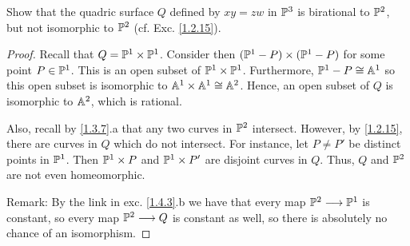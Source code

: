 \label{1.4.5}

Show that the quadric surface $Q$ defined by $xy = zw$ in $\P^3$ is birational to $\P^2$, but not isomorphic to $\P^2$ (cf. Exc. \ref{1.2.15}).

\begin{proof}
    Recall that $Q = \P^1 \times \P^1$. Consider then $(\P^1 - P) \times (\P^1 - P)$ for some point $P \in \P^1$. This is an open subset of $\P^1 \times \P^1$. Furthermore, $\P^1 - P \cong \A^1$ so this open subset is isomorphic to $\A^1 \times \A^1 \cong \A^2$. Hence, an open subset of $Q$ is isomorphic to $\A^2$, which is rational.

    Also, recall by \ref{1.3.7}.a that any two curves in $\P^2$ intersect. However, by \ref{1.2.15}, there are curves in $Q$ which do not intersect. For instance, let $P \neq P'$ be distinct points in $\P^1$. Then $\P^1 \times P$ and $\P^1 \times P'$ are disjoint curves in $Q$. Thus, $Q$ and $\P^2$ are not even homeomorphic.

    Remark: By the link in exc. \ref{1.4.3}.b we have that every map $\P^2 \longrightarrow \P^1$ is constant, so every map $\P^2 \longrightarrow Q$ is constant as well, so there is absolutely no chance of an isomorphism.
\end{proof}
